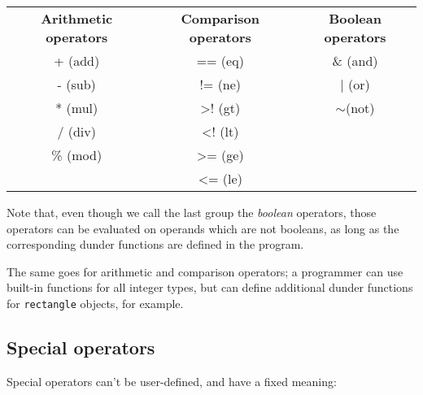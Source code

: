 \documentclass[times, utf8, diplomski]{fer}
\theoremstyle{definition}
\begin{document}
\begin{table}[H]
\begin{tabular}{ccc}
\textbf{Arithmetic operators} & \textbf{Comparison operators} & \textbf{Boolean operators} \\
+ (add)                       & == (eq)                       & \& (and)                   \\
- (sub)                       & != (ne)                       & | (or)                     \\
* (mul)                       & \textgreater{}! (gt)          & $\sim$(not)                \\
/ (div)                       & \textless{}! (lt)             &                            \\
\% (mod)                      & \textgreater{}= (ge)          &                            \\
                              & \textless{}= (le)             &                           
\end{tabular}
\end{table}

Note that, even though we call the last group the \textit{boolean} operators,
those operators can be evaluated on operands which are not booleans,
as long as the corresponding dunder functions are defined in the program.

The same goes for arithmetic and comparison operators; a programmer can use
built-in functions for all integer types, but can define additional dunder functions
for \texttt{rectangle} objects, for example.

\subsection{Special operators}

Special operators can't be user-defined, and have a fixed meaning:
\end{document}
